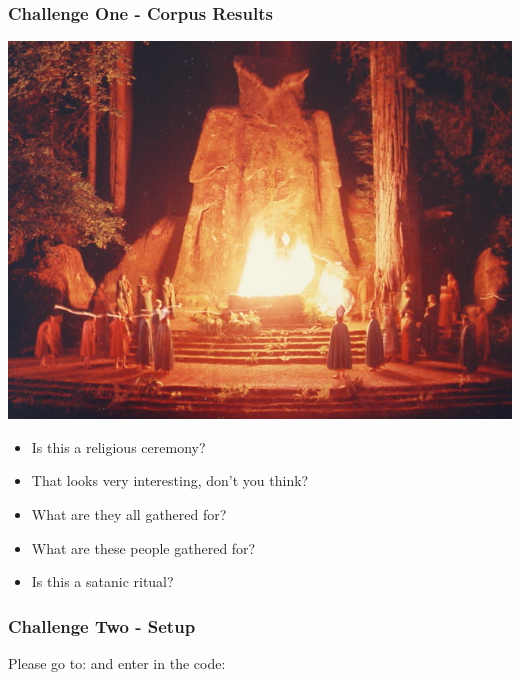 \documentclass[xcolor=dvipsnames]{beamer}
\begin{document}
		\begin{frame}
			\frametitle{Challenge One - Corpus Results}
			\centering
			\includegraphics[scale=0.2]{images/cremation_of_care.jpg}
			\begin{itemize}
				\item Is this a religious ceremony?
				\item That looks very interesting, don't you think?
				\item What are they all gathered for?
				\item What are these people gathered for?
				\item Is this a satanic ritual?
			\end{itemize}
		\end{frame}
	
		\begin{frame}
			\frametitle{Challenge Two - Setup}
			Please go to: and enter in the code:
		\end{frame}
	
		
\end{document}
